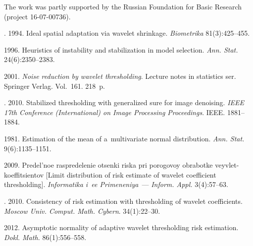 



\Ack
\noindent
The work was partly supported by the Russian Foundation for Basic
Research (project 16-07-00736).



  \begin{multicols}{2}

\renewcommand{\bibname}{\protect\rmfamily References}

{\small\frenchspacing
 {%
 \begin{thebibliography}{99}
. 1994. 
Ideal spatial adaptation via wavelet shrinkage. \textit{Biometrika} 81(3):425--455.

 1996. Heuristics of instability and stabilization in model selection. 
\textit{Ann. Stat.} 24(6):2350--2383.

 2001. \textit{Noise reduction by wavelet thresholding}. 
Lecture notes in statistics ser. Springer Verlag.  Vol.~161. 218~p.

. 2010. 
Stabilized thresholding with generalized sure for image denoising. 
\textit{IEEE
17th  Conference (International) on Image Processing Proceedings}.
IEEE. 1881--1884.

 1981. Estimation of the mean of a~multivariate normal distribution. 
\textit{Ann. Stat.} 9(6):1135--1151.

 2009. Predel'noe raspredelenie otsenki riska pri porogovoy 
obrabotke veyvlet-koeffitsientov [Limit distribution of risk estimate of wavelet 
coefficient thresholding].
\textit{Informatika i~ee Primeneniya}~--- \textit{Inform. Appl.} 3(4):57--63.

. 2010. 
Consistency of risk estimation with 
thresholding of wavelet coefficients. 
\textit{Moscow Univ. Comput. Math. Cybern}. 34(1):22--30.

 2012. 
Asymptotic normality of adaptive wavelet thresholding risk estimation.
\textit{Dokl. Math.} 86(1):556--558.


\end{thebibliography}}}
\end{multicols}
